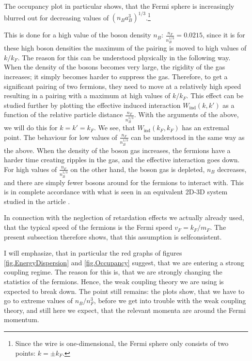 The occupancy plot in particular shows, that the Fermi sphere is increasingly blurred out for decreasing values of $(n_Ba_B^3)^{1/3}$.\footnote{Since the wire is one-dimensional, the Fermi sphere only consists of two points: $k = \pm k_F$.} 

This is done for a high value of the boson density $n_B$: $\frac{n_F}{n_B^{1/3}} = 0.0215$, since it is for these high boson densities the maximum of the pairing is moved to high values of $k/k_F$. The reason for this can be understood physically in the following way. When the density of the bosons becomes very large, the rigidity of the gas increases; it simply becomes harder to suppress the gas. Therefore, to get a significant pairing of two fermions, they need to move at a relatively high speed resulting in a pairing with a maximum at high values of $k/k_F$. This effect can be studied further by plotting the effective induced interaction $W_{\text{ind}}(k,k')$ as a function of the relative particle distance $\frac{n_F}{n_B^{1/3}}$. With the arguments of the above, we will do this for $k = k' = k_F$. We see, that $W_{\text{ind}}(k_F,k_F)$ has an extremal point. The behaviour for low values of $\frac{n_F}{n_B^{1/3}}$ can be understood in the same way as the above. When the density of the boson gas increases, the fermions have a harder time creating ripples in the gas, and the effective interaction goes down. For high values of $\frac{n_F}{n_B^{1/3}}$ on the other hand, the boson gas is depleted, $n_B$ decreases, and there are simply fewer bosons around for the fermions to interact with. This is in complete accordance with what is seen in an equivalent 2D-3D system studied in the article \cite{BruunZhigangTopSuperfluid}. 

In connection with the neglection of retardation effects we actually already used, that the typical speed of the fermions is the Fermi speed $v_F = k_F/m_F$. The present subsection therefore shows, that this assumption is selfconsistent. 

I will emphasize, that in particular the red graphs of figures \ref{fig.EnergyDispersion} and \ref{fig.Occupancy} suggest, that we are entering a strong coupling regime. The reason for this is, that we are strongly changing the statistics of the fermions. Hence, the weak coupling theory we are using is expected to break down. The point still remains: the plots show, that we have to go to extreme values of $n_B/n_F^3$, before we get into trouble with the weak coupling theory, and still here we expect, that the relevant momenta are around the Fermi momentum. 

